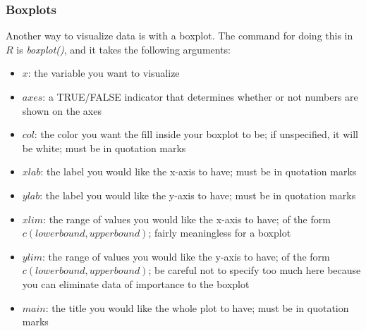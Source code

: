 \documentclass[11pt]{article}\usepackage[]{graphicx}\usepackage[]{color}
\begin{document}
\subsubsection{Boxplots}
Another way to visualize data is with a boxplot.  The command for doing this in $R$ is \textit{boxplot()}, and it takes the following arguments:
\begin{itemize}
\item $x$: the variable you want to visualize
\item $axes$: a TRUE/FALSE indicator that determines whether or not numbers are shown on the axes
\item $col$: the color you want the fill inside your boxplot to be; if unspecified, it will be white; must be in quotation marks
\item $xlab$: the label you would like the x-axis to have; must be in quotation marks
\item $ylab$: the label you would like the y-axis to have; must be in quotation marks
\item $xlim$: the range of values you would like the x-axis to have; of the form $c(lower bound, upper bound)$; fairly meaningless for a boxplot
\item $ylim$: the range of values you would like the y-axis to have; of the form $c(lower bound, upper bound)$; be careful not to specify too much here because you can eliminate data of importance to the boxplot
\item $main$: the title you would like the whole plot to have; must be in quotation marks
\end{itemize}
\end{document}
